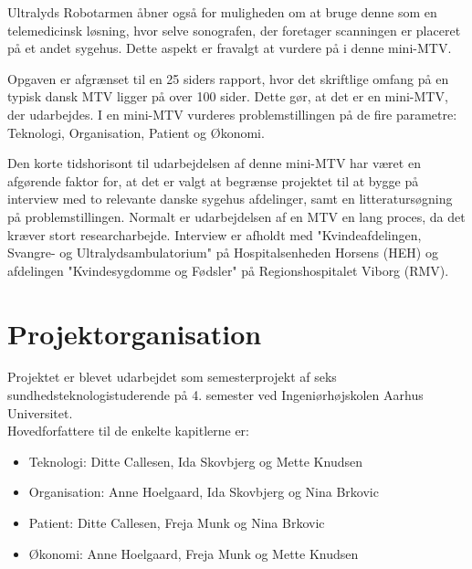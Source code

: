 Ultralyds Robotarmen åbner også for muligheden om at bruge denne som en telemedicinsk løsning, hvor selve sonografen, der foretager scanningen er placeret på et andet sygehus. Dette aspekt er fravalgt at vurdere på i denne mini-MTV. 

Opgaven er afgrænset til en 25 siders rapport, hvor det skriftlige omfang på en typisk dansk MTV ligger på over 100 sider. Dette gør, at det er en mini-MTV, der udarbejdes. I en mini-MTV vurderes problemstillingen på de fire parametre: Teknologi, Organisation, Patient og Økonomi. 

Den korte tidshorisont til udarbejdelsen af denne mini-MTV har været en afgørende faktor for, at det er valgt at begrænse projektet til at bygge på interview med to relevante danske sygehus afdelinger, samt en litteratursøgning på problemstillingen. Normalt er udarbejdelsen af en MTV en lang proces, da det kræver stort researcharbejde. Interview er afholdt med "Kvindeafdelingen, Svangre- og Ultralydsambulatorium" på Hospitalsenheden Horsens (HEH) og afdelingen "Kvindesygdomme og Fødsler" på Regionshospitalet Viborg (RMV).

\section{Projektorganisation}
Projektet er blevet udarbejdet som semesterprojekt af seks sundhedsteknologistuderende på 4. semester ved Ingeniørhøjskolen Aarhus Universitet. \\
Hovedforfattere til de enkelte kapitlerne er:
\begin{itemize}
\item Teknologi: Ditte Callesen, Ida Skovbjerg og  Mette Knudsen
\item Organisation: Anne Hoelgaard, Ida Skovbjerg og Nina Brkovic
\item Patient: Ditte Callesen, Freja Munk og Nina Brkovic
\item Økonomi: Anne Hoelgaard, Freja Munk og Mette Knudsen
\end{itemize}

\label{version_Systemark}
